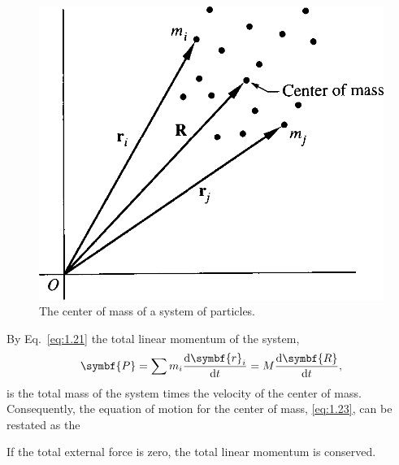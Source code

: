 \begin{figure}[htbp]
    \centering
    \includegraphics[scale = 0.225]{01/figures/1.1}
    \caption{The center of mass of a system of particles.}
    \label{fig:1.1}
\end{figure}

By Eq.~\eqref{eq:1.21} the total linear momentum of the system,
\begin{equation}
    \symbf{P}=\sum m_i\odv{\symbf{r}_i}{t}=M\odv{\symbf{R}}{t},\label{eq:1.23}
\end{equation}
is the total mass of the system times the velocity of the center of mass. Consequently, the equation of motion for the center of mass, \eqref{eq:1.23}, can be restated as the
\begin{theorem}
    If the total external force is zero, the total linear momentum is conserved.
\end{theorem}


